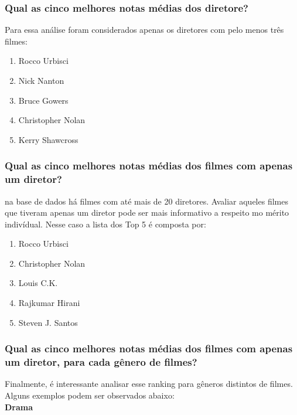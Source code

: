 \documentclass[a4paper, 12pt]{article} %
\begin{document}
\subsubsection{Qual as cinco melhores notas médias dos diretore?}

Para essa análise foram considerados apenas os diretores com pelo menos três filmes:

\begin{enumerate}[topsep=0pt,partopsep=0pt]
    \item Rocco Urbisci
    \item Nick Nanton
    \item Bruce Gowers
    \item Christopher Nolan
    \item Kerry Shawcross
\end{enumerate}



\subsubsection{Qual as cinco melhores notas médias dos filmes com apenas um diretor?}

na base de dados há filmes com até mais de 20 diretores. Avaliar aqueles filmes que tiveram apenas um diretor pode ser mais informativo a respeito mo mérito indivídual. Nesse caso a lista dos Top 5 é composta por:\\

\begin{enumerate}[topsep=0pt,partopsep=0pt]
    \item Rocco Urbisci
    \item Christopher Nolan
    \item Louis C.K.
    \item Rajkumar Hirani
    \item Steven J. Santos
\end{enumerate}

\subsubsection{Qual as cinco melhores notas médias dos filmes com apenas um diretor, para cada gênero de filmes?}

Finalmente, é interessante analisar esse ranking para gêneros distintos de filmes. Alguns exemplos podem ser observados abaixo:\\

\textbf{Drama}
\end{document}

